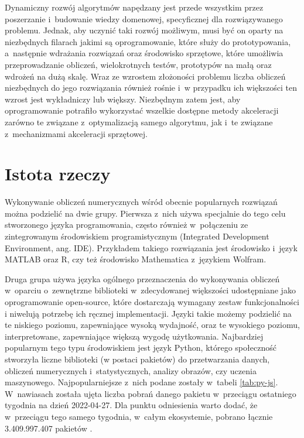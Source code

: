 Dynamiczny rozwój algorytmów napędzany jest przede wszystkim przez poszerzanie i~budowanie wiedzy domenowej, specyficznej dla rozwiązywanego problemu. Jednak, aby uczynić taki rozwój możliwym, musi być on oparty na niezbędnych filarach jakimi są oprogramowanie, które służy do prototypowania, a~następnie wdrażania rozwiązań oraz środowisko sprzętowe, które umożliwia przeprowadzanie obliczeń, wielokrotnych testów, prototypów na małą oraz wdrożeń na dużą skalę. Wraz ze wzrostem złożoności problemu liczba obliczeń niezbędnych do jego rozwiązania również rośnie i~w przypadku ich większości ten wzrost jest wykładniczy lub większy. Niezbędnym zatem jest, aby oprogramowanie potrafiło wykorzystać wszelkie dostępne metody akceleracji zarówno te związane z~optymalizacją samego algorytmu, jak i~te związane z~mechanizmami akceleracji sprzętowej.

\section{Istota rzeczy}

Wykonywanie obliczeń numerycznych wśród obecnie popularnych rozwiązań można podzielić na dwie grupy. Pierwsza z~nich używa specjalnie do tego celu stworzonego języka programowania, często również w~połączeniu ze zintegrowanym środowiskiem programistycznym (Integrated Development Environment, ang. IDE). Przykładem takiego rozwiązania jest środowisko i~język MATLAB\cite{matlab} oraz R\cite{r}, czy też środowisko Mathematica z~językiem Wolfram\cite{mathematica}.

Druga grupa używa języka ogólnego przeznaczenia do wykonywania obliczeń w~oparciu o~zewnętrzne biblioteki w~zdecydowanej większości udostępniane jako oprogramowanie open-source, które dostarczają wymagany zestaw funkcjonalności i niwelują potrzebę ich ręcznej implementacji. Języki takie możemy podzielić na te niskiego poziomu, zapewniające wysoką wydajność, oraz te wysokiego poziomu, interpretowane, zapewniające większą wygodę użytkowania. Najbardziej popularnym tego typu środowiskiem jest język Python, którego społeczność stworzyła liczne biblioteki (w postaci pakietów) do przetwarzania danych, obliczeń numerycznych i~statystycznych, analizy obrazów, czy uczenia maszynowego. Najpopularniejsze z~nich podane zostały w~tabeli \ref{tab:py-js}. W~nawiasach została ujęta liczba pobrań danego pakietu w~przeciągu ostatniego tygodnia na dzień 2022-04-27. Dla punktu odniesienia warto dodać, że w~przeciągu tego samego tygodnia, w~całym ekosystemie, pobrano łącznie 3.409.997.407 pakietów \cite{pypi-stats}.

